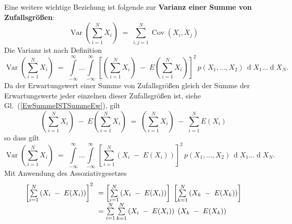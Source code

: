 
Eine weitere wichtige Beziehung ist folgende zur
\textbf{Varianz einer Summe von Zufallsgrößen}:
\begin{equation}
\operatorname {Var}\left(\sum _{{i=1}}^{N}X_{i}\right) \; = \;
\sum _{{i,j=1}}^{N}\operatorname {Cov}(X_{i},X_{j})
\label{VarianzSummeISTSummeKovarianz}
\end{equation}
Die Varianz ist nach Definition
\begin{equation}
\operatorname {Var}\left(\sum _{{i=1}}^{N}X_{i}\right) \; = \;
\int\limits_{-\infty}^{\infty} \dots \int\limits_{-\infty}^{\infty}
\, \left[ \left(\sum_{i=1}^N X_i\right) \; - \; E(\sum_{i=1}^N X_i) \right]^2 \, p(X_1, \dots, X_2)
\, \operatorname{d}X_1 \dots \operatorname{d}X_N .
\end{equation}
Da der Erwartungswert einer Summe von Zufallsgrößen gleich der Summe der 
Erwartungswerte jeder einzelnen dieser Zufallsgrößen ist, siehe Gl.~(\ref{EwSummeISTSummeEw}), gilt
$$
\left(\sum_{i=1}^N X_i \right) \; - \; E(\sum_{i=1}^N X_i) \; = \;
\left(\sum_{i=1}^N X_i \right) \; - \; \sum_{i=1}^N E(X_i) 
$$
so dass gilt
\begin{equation}
\operatorname {Var}\left(\sum _{{i=1}}^{N}X_{i}\right) \; = \;
\int\limits_{-\infty}^{\infty} \dots \int\limits_{-\infty}^{\infty}
\, \left[ \sum_{i=1}^N \left(X_i \; - \; E(X_i)\right) \right]^2 \, p(X_1, \dots, X_2)
\, \operatorname{d}X_1 \dots \operatorname{d}X_N .
\end{equation}
Mit Anwendung des Assoziativgesetzes
$$
\arraycolsep=3.5pt\def\arraystretch{1.8}
\begin{array}{ll}
\left[ \sum\limits_{i=1}^N \left(X_i \; - \; E(X_i)\right) \right]^2 & =
\left[ \sum\limits_{i=1}^N \left(X_i \; - \; E(X_i)\right) \right] \;
\left[ \sum\limits_{k=1}^N \left(X_k \; - \; E(X_k)\right) \right] \\
& = \sum\limits_{i=1}^N \sum\limits_{k=1}^N  \left(X_i \; - \; E(X_i)\right) \;
\left(X_k \; - \; E(X_k)\right) \\
\end{array}
$$

